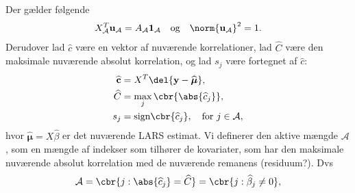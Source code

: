 Der gælder følgende 
%
 \begin{align*}
 X^T_{\mathcal{A}} \textbf{u}_{\mathcal{A}} = A_{\mathcal{A}}  \textbf{1}_{\mathcal{A}}   \quad  \text{og} \quad \norm{ \textbf{u}_{\mathcal{A}}}^2 = 1.
\end{align*}  
%
Derudover lad $\widehat{c}$ være en vektor af nuværende korrelationer, lad $\widehat{C}$ være den maksimale nuværende absolut korrelation, og lad $s_j$ være fortegnet af $\widehat{c}$: 
%
\begin{align*}
 \widehat{\textbf{c}} & = X^T \del{ \textbf{y}- \widehat{\boldsymbol{\mu}}}, \\
 \widehat{C} & = \max_j \cbr{\abs{\widehat{c}_j}}, \\
 s_j &  = \text{sign} \cbr{\widehat{c}_j}, \quad \text{for } j \in \mathcal{A},
\end{align*}
%
hvor $\widehat{\boldsymbol{\mu}} = X \widehat{\beta}$ er det nuværende LARS estimat. Vi definerer den aktive mængde $\mathcal{A}$, som en mængde af indekser som tilhører de kovariater, som har den maksimale nuværende absolut korrelation med de nuværende remanens (residuum?).  Dvs 
\begin{align*}
\mathcal{A} = \cbr{j : \abs{\widehat{c}_j} = \widehat{C}} = \cbr{j : \widehat{\beta}_j \neq 0},
\end{align*}

